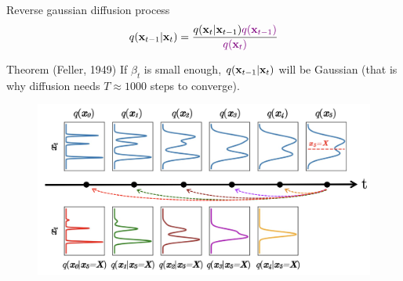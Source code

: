 \begin{frame}{Reverse gaussian diffusion process}
		\vspace{-0.4cm}
		\[
			q(\mathbf{x}_{t-1}|\mathbf{x}_{t}) = \frac{q(\mathbf{x}_{t}|\mathbf{x}_{t-1}) {\color{violet}q(\mathbf{x}_{t-1})}}{{\color{violet}q(\mathbf{x}_{t})}} 
		\]
		\vspace{-0.4cm}
		\begin{block}{Theorem (Feller, 1949)}
			If $\beta_t$ is small enough, $q(\mathbf{x}_{t-1}|\mathbf{x}_{t})$ will be Gaussian {\color{gray}(that is why diffusion needs $T \approx 1000$ steps to converge)}.
		\end{block}
		\vspace{-0.3cm}
		\begin{figure}
			\includegraphics[width=0.7\linewidth]{figs/inverse_distr_1d}
		\end{figure}
	\end{frame} 
